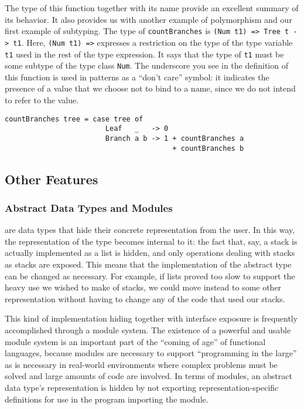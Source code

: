 The type of this function together with its name provide an excellent summary of its behavior. It also provides us with another example of polymorphism and our first example of subtyping. The type of \lstinline{countBranches} is \lstinline{(Num t1) => Tree t -> t1}. Here, \lstinline{(Num t1) =>} expresses a restriction on the type of the type variable \lstinline{t1} used in the rest of the type expression. It says that the type of \lstinline{t1} must be some subtype of the type class \lstinline{Num}. The underscore you see in the definition of this function is used in patterns as a ``don't care'' symbol: it indicates the presence of a value that we choose not to bind to a name, since we do not intend to refer to the value.

\begin{lstlisting}[float,caption={Pattern-matching via \code{case}},label={features:case}]
countBranches tree = case tree of
                        Leaf   _   -> 0
                        Branch a b -> 1 + countBranches a
                                        + countBranches b
\end{lstlisting}

\subsection{Other Features}
\subsubsection{Abstract Data Types and Modules}
 are data types that hide their concrete representation from the user. In this way, the representation of the type becomes internal to it: the fact that, say, a stack is actually implemented as a list is hidden, and only operations dealing with stacks as stacks are exposed. This means that the implementation of the abstract type can be changed as necessary. For example, if lists proved too slow to support the heavy use we wished to make of stacks, we could move instead to some other representation without having to change any of the code that used our stacks.

This kind of implementation hiding together with interface exposure is frequently accomplished through a module system. The existence of a powerful and usable module system is an important part of the ``coming of age'' of functional languages, because modules are necessary to support ``programming in the large'' as is necessary in real-world environments where complex problems must be solved and large amounts of code are involved. In terms of modules, an abstract data type's representation is hidden by not exporting representation-specific definitions for use in the program importing the module.

